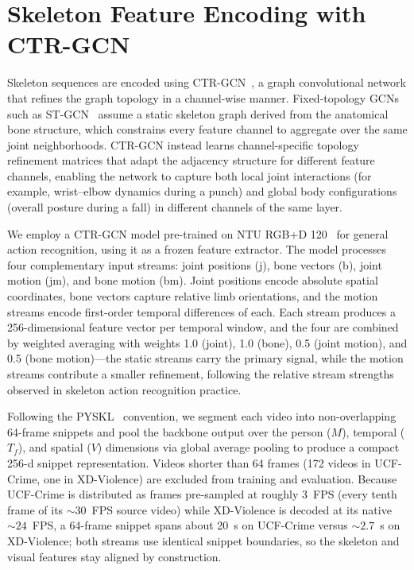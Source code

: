 \section{Skeleton Feature Encoding with CTR-GCN}
\label{sec:meth-ctrgcn}

Skeleton sequences are encoded using CTR-GCN~\cite{chen2021ctrgcn}, a graph convolutional network
that refines the graph topology in a channel-wise manner. Fixed-topology GCNs such as
ST-GCN~\cite{yan2018stgcn} assume a static skeleton graph derived from the anatomical bone
structure, which constrains every feature channel to aggregate over the same joint neighborhoods.
CTR-GCN instead learns channel-specific topology refinement matrices that adapt the adjacency
structure for different feature channels, enabling the network to capture both local joint
interactions (for example, wrist--elbow dynamics during a punch) and global body configurations
(overall posture during a fall) in different channels of the same layer.

We employ a CTR-GCN model pre-trained on NTU RGB+D 120~\cite{yan2022pyskl} for general action
recognition, using it as a frozen feature extractor. The model processes four complementary input
streams: joint positions (j), bone vectors (b), joint motion (jm), and bone motion (bm). Joint
positions encode absolute spatial coordinates, bone vectors capture relative limb orientations,
and the motion streams encode first-order temporal differences of each. Each stream produces a
256-dimensional feature vector per temporal window, and the four are combined by weighted
averaging with weights 1.0 (joint), 1.0 (bone), 0.5 (joint motion), and 0.5 (bone motion)---the
static streams carry the primary signal, while the motion streams contribute a smaller refinement,
following the relative stream strengths observed in skeleton action recognition practice.

Following the PYSKL~\cite{yan2022pyskl} convention, we segment each video into non-overlapping 64-frame snippets and pool the backbone output over the person ($M$), temporal ($T_f$), and spatial ($V$) dimensions via global average pooling to produce a compact 256-d snippet representation. Videos shorter than 64 frames (172 videos in UCF-Crime, one in XD-Violence) are excluded from training and evaluation. Because UCF-Crime is distributed as frames pre-sampled at roughly 3~FPS (every tenth frame of its ${\sim}30$~FPS source video) while XD-Violence is decoded at its native ${\sim}24$~FPS, a 64-frame snippet spans about 20~s on UCF-Crime versus ${\sim}2.7$~s on XD-Violence; both streams use identical snippet boundaries, so the skeleton and visual features stay aligned by construction.

